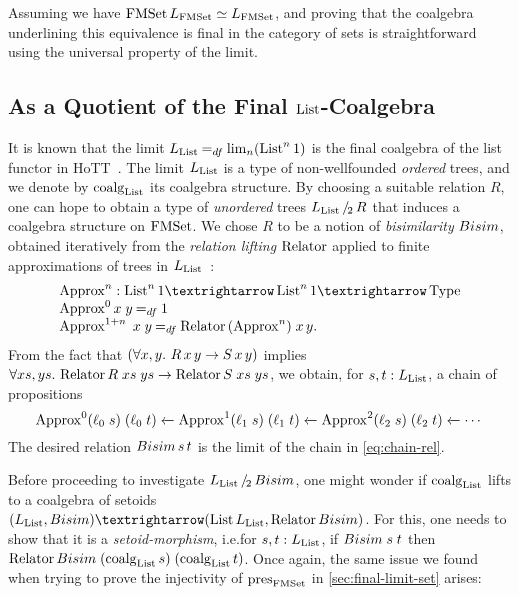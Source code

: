 \documentclass[final,a4paper,USenglish,cleveref]{lipics-v2021}
\begin{document}
Assuming \LLPO{} we have $\FMSet \Lim{\FMSet} \simeq \Lim{\FMSet}$, and proving that the coalgebra underlining this equivalence is final in the category of sets is straightforward using the universal property of the limit.

\subsection{As a Quotient of the Final \texorpdfstring{$\List$}{List}-Coalgebra}\label{sec:final-quotient-set}

It is known that the limit $\Lim{\List} \DefEq \lim_n (\List^n 1)$ is the final coalgebra of the list functor in HoTT~\cite{Ahrens2015}.
The limit $\Lim{\List}$ is a type of non-wellfounded \emph{ordered} trees,
and we denote by $\coalg{\List}$ its coalgebra structure.
By choosing a suitable relation $R$, one can hope to obtain a type of
\emph{unordered} trees $\SetQuot[\Lim{\List}][R]$ that induces a coalgebra structure on $\FMSet$.
We chose $R$ to be a notion of \emph{bisimilarity} $\Bisim$,
obtained iteratively from the \emph{relation lifting} $\Relator$ applied to finite approximations of trees in $\Lim{\List}$~\cite{Hasuo2013}:
\[
\begin{array}{l}
  \Approx^n : \List^n 1 → \List^n 1 → \Type \\
  \Approx^0 x\;y \DefEq 1 \\
  \Approx^{1+n}\;x\;y \DefEq \Relator \,(\Approx^n)\;x\,y.
\end{array}
\]
From the fact that $(\forall x,y\mathpunct{.}\, R \,x\,y \to S \,x\,y)$ implies $\forall xs,ys \Where \Relator  R\;xs\;ys \to \Relator S\;xs\;ys$,
we obtain, for $s, t : \Lim{\List}$, a chain of propositions
\begin{equation}\label{eq:chain-rel}
  \Approx^0 (\ell_0\; s)\; (\ell_0\; t)
    \xleftarrow{} {\Approx^1 (\ell_1\; s)\; (\ell_1\; t)}
    \xleftarrow{} {\Approx^2 (\ell_2\; s)\; (\ell_2\; t)}
    \xleftarrow{} %
      \cdots
\end{equation}
The desired relation $\Bisim\,s\,t$ is the limit of the chain in \eqref{eq:chain-rel}.

Before proceeding to investigate $\SetQuot[\Lim{\List}][\Bisim]$,
one might wonder if $\coalg{\List}$ lifts to a coalgebra of setoids $(\Lim{\List}, \Bisim) → (\List \Lim{\List}, \Relator \Bisim)$.
For this, one needs to show that it is a \emph{setoid-morphism},
i.e.\@ for $s, t : \Lim{\List}$, if $\Bisim\;s\;t$
then $\Relator \Bisim\; (\coalg{\List} s)\; (\coalg{\List} t)$.
Once again, the same issue we found when trying to prove the injectivity of $\pres{\FMSet}$ in \cref{sec:final-limit-set} arises:
\end{document}
